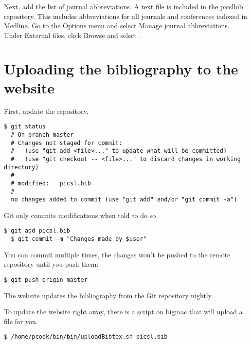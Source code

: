 \documentclass{InsightArticle}
\begin{document}
Next, add the list of journal abbreviations. A text file  is included in the picslbib repository. This includes abbreviations for all journals and conferences indexed in Medline. Go to the Options menu and select Manage journal abbreviations. Under External files, click Browse and select .



\section{Uploading the bibliography to the website}

First, update the repository.

\begin{lstlisting}[style=bash]
  $ git status
  # On branch master
  # Changes not staged for commit:
  #   (use "git add <file>..." to update what will be committed)
  #   (use "git checkout -- <file>..." to discard changes in working directory)
  #
  #	modified:   picsl.bib
  #
  no changes added to commit (use "git add" and/or "git commit -a")
\end{lstlisting}

Git only commits modifications when told to do so
\begin{lstlisting}[style=bash]
  $ git add picsl.bib
  $ git commit -m "Changes made by $user" 
\end{lstlisting}

You can commit multiple times, the changes won't be pushed to the remote repository until you push them:
\begin{lstlisting}[style=bash]
  $ git push origin master 
\end{lstlisting}

The website updates the bibliography from the Git repository nightly.

To update the website right away, there is a script on bigmac that will upload a file for you.
\begin{lstlisting}[style=bash]
  $ /home/pcook/bin/bin/uploadBibtex.sh picsl.bib
\end{lstlisting}



\end{document}
